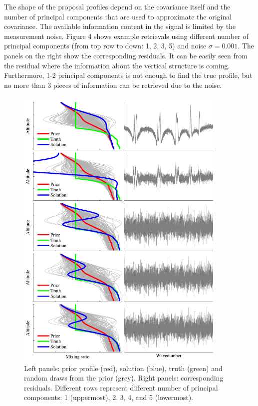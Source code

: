 \documentclass[12pt,a4paper]{article}
\begin{document}
The shape of the proposal profiles depend on the covariance itself and the number of principal components 
that are used to approximate the original covariance. The available information content in the signal 
is limited by the measurement noise. Figure 4 shows example retrievals using different
number of principal components (from top row to down: 1, 2, 3, 5) and noise $\sigma=0.001$. The panels on the right
show the corresponding residuals. It can be easily seen from the residual where the information about the
vertical structure is coming. Furthermore, 1-2 principal components is not enough to find the true profile, but no more 
than 3 pieces of information can be retrieved due to the noise.
\begin{figure}[h]
  \label{simu_results}
  \centering
  \includegraphics[width=0.9\textwidth]{figs/special_solution.pdf}
  \caption{Left panels: prior profile (red), solution (blue), truth (green) and random draws from the prior (grey). Right panels: corresponding residuals. Different rows 
    represent different number of principal components: 1 (uppermost), 2, 3, 4, and 5 (lowermost).}
\end{figure}
\end{document}
